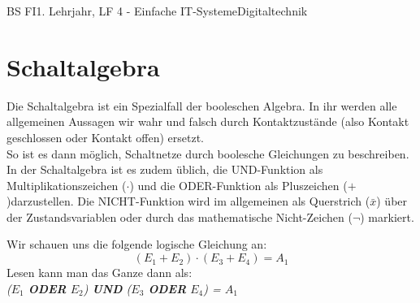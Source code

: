\documentclass[11pt,twocolumn,oneside,openany,headings=optiontotoc,11pt,numbers=noenddot]{article}
\begin{document}
\begin{worksheet}{BS FI}{1. Lehrjahr, LF 4 - Einfache IT-Systeme}{Digitaltechnik}
		\section{Schaltalgebra}
		Die Schaltalgebra ist ein Spezialfall der booleschen Algebra. In ihr werden alle allgemeinen Aussagen wir \glqq{}wahr\grqq{} und \glqq{}falsch\grqq{} durch Kontaktzustände (also Kontakt geschlossen oder Kontakt offen) ersetzt.\\
		So ist es dann möglich, Schaltnetze durch boolesche Gleichungen zu beschreiben. In der Schaltalgebra ist es zudem üblich, die UND-Funktion als Multiplikationszeichen (\(\cdot\)) und die ODER-Funktion als Pluszeichen (\(+\))darzustellen. Die NICHT-Funktion wird im allgemeinen als Querstrich (\(\bar{x}\)) über der Zustandsvariablen oder durch das mathematische Nicht-Zeichen (\(\neg\)) markiert.\\
		\par\noindent
		Wir schauen uns die folgende \glqq{}logische Gleichung\grqq{} an:\[(E_1 + E_2)\cdot(E_3+E_4) = A_1\]
		Lesen kann man das Ganze dann als:\\
		\textit{(\(E_1\) \textbf{ODER} \(E_2\)) \textbf{UND} (\(E_3\) \textbf{ODER} \(E_4\)) = \(A_1\)}

\end{worksheet}
\end{document}
